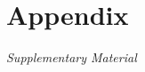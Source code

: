 \documentclass[10pt]{beamer}
\begin{document}
\section{Appendix}
\begin{frame}
	\begin{center}
	\Huge\emph{Supplementary Material}
	\end{center}
\end{frame}
\addtocounter{framenumber}{-1}
\end{document}
